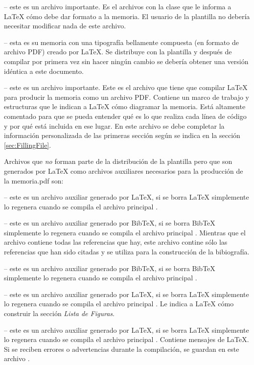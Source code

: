  -- este es un archivo importante. Es el archivos con la clase que le informa a \LaTeX{} cómo debe dar formato a la memoria. El usuario de la plantilla no debería necesitar modificar nada de este archivo.

 -- esta es su memoria con una tipografía bellamente compuesta (en formato de archivo PDF) creado por \LaTeX{}. Se distribuye con la plantilla y después de compilar por primera vez sin hacer ningún cambio se debería obtener una versión idéntica a este documento.

 -- este es un archivo importante. Este es el archivo que tiene que compilar \LaTeX{} para producir la memoria como un archivo PDF. Contiene un marco de trabajo y estructuras que le indican a \LaTeX{} cómo diagramar la memoria.  Está altamente comentado para que se pueda entender qué es lo que realiza cada línea de código y por qué está incluida en ese lugar.  En este archivo se debe completar la información personalizada de las primeras sección según se indica en la sección \ref{sec:FillingFile}.

Archivos que \emph{no} forman parte de la distribución de la plantilla pero que son generados por \LaTeX{} como archivos auxiliares necesarios para la producción de la memoria.pdf son:

 -- este es un archivo auxiliar generado por \LaTeX{}, si se borra \LaTeX{} simplemente lo regenera cuando se compila el archivo principal .

 -- este es un archivo auxiliar generado por BibTeX, si se borra BibTeX simplemente lo regenera cuando se compila el archivo principal . Mientras que el archivo  contiene todas las referencias que hay, este archivo  contine sólo las referencias que han sido citadas y se utiliza para la construcción de la bibiografía.

 -- este es un archivo auxiliar generado por BibTeX, si se borra BibTeX simplemente lo regenera cuando se compila el archivo principal .

 -- este es un archivo auxiliar generado por \LaTeX{}, si se borra \LaTeX{} simplemente lo regenera cuando se compila el archivo principal .  Le indica a \LaTeX{} cómo construir la sección \emph{Lista de Figuras}.
 
 --  este es un archivo auxiliar generado por \LaTeX{}, si se borra \LaTeX{} simplemente lo regenera cuando se compila el archivo principal . Contiene mensajes de \LaTeX{}. Si se reciben errores o advertencias durante la compilación, se guardan en este archivo .

